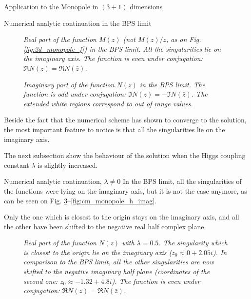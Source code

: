 \begin{section}{Application to the Monopole in $(3+1)$ dimensions}
\begin{subsection}{Numerical analytic continuation in the BPS limit}
    \begin{figure}[!ht]
      \begin{center}
        
        \caption{\em Real part of the function $M(z)$ (not $M(z)/z$,
          as on Fig. \ref{fig:2d_monopole_f}) in the BPS
          limit. All the singularities lie on the imaginary axis. The
          function is even under conjugation: $\Re N(z) = \Re N(\bar
          z)$.}
        \label{fig:cm_monopole_h_real_bps}
      \end{center}
    \end{figure}

    \begin{figure}[!ht]
      \begin{center}
        
        \caption{\em Imaginary part of the function $N(z)$ in the BPS
          limit. The function is odd under conjugation: $\Im N(z) =
          -\Im N(\bar z)$. The extended white regions correspond to
          out of range values.}
        \label{fig:cm_monopole_h_imag_bps}
      \end{center}
    \end{figure}
    Beside the fact that the numerical scheme has shown to converge
    to the solution, the most important feature to notice is that
    all the singularities lie on the imaginary axis.
    
    The next subsection show the behaviour of the solution when the
    Higgs coupling constant $\lambda$ is slightly increased.
  \end{subsection}
  \begin{subsection}{Numerical analytic continuation, $\lambda \neq 0$}
    In the BPS limit, all the singularities of the functions were lying on
    the imaginary axis, but it is not the case anymore, as can be seen
    on Fig. \ref{fig:cm_monopole_f_real}--\ref{fig:cm_monopole_h_imag}.

    Only the one which is closest to the origin stays on the imaginary
    axis, and all the other have been shifted to the negative real
    half complex plane.
    \begin{figure}[!ht]
      \begin{center}
        
        \caption{\em Real part of the function $N(z)$ with $\lambda =
          0.5$. The singularity which is closest to the origin lie on
          the imaginary axis ($z_0\approx 0+2.05i$). In comparison to
          the BPS limit, all the other singularities are now shifted
          to the negative imaginary half plane (coordinates of the
          second one: $z_0\approx -1.32+4.8i$). The function is even
          under conjugation: $\Re N(z) = \Re N(\bar z)$.}
        \label{fig:cm_monopole_f_real}
      \end{center}
    \end{figure}


\end{subsection}
\end{section}
